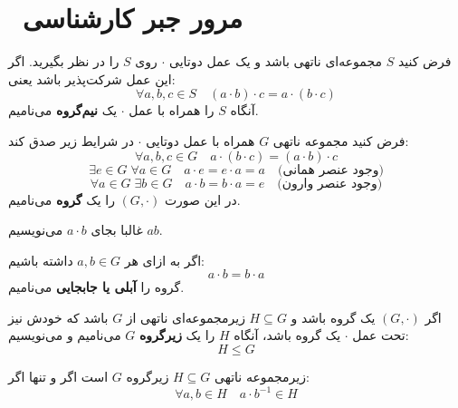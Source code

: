 \section{ مرور جبر کارشناسی}


\begin{definition}
    فرض کنید \( S \) مجموعه‌ای ناتهی باشد و یک عمل دوتایی \(\cdot\) روی \( S \) را در نظر بگیرید.  
    اگر این عمل شرکت‌پذیر باشد یعنی:
    \[
        \forall a, b, c \in S \quad (a \cdot b) \cdot c = a \cdot (b \cdot c)
    \]
    آنگاه \( S \) را همراه با عمل \(\cdot\) یک \textbf{نیم‌گروه } می‌نامیم.
    
\end{definition}



\begin{definition}[- گروه]
    فرض کنید مجموعه ناتهی \( G \) همراه با عمل دوتایی \(\cdot\) در شرایط زیر صدق کند:
    \[\forall a, b, c \in G \quad a \cdot (b \cdot c) = (a \cdot b) \cdot c\]
    \[\exists e \in G \; \forall a \in G \quad a \cdot e = e \cdot a = a \quad \text{(وجود عنصر همانی)}\]
    \[\forall a \in G \; \exists b \in G \quad a \cdot b = b \cdot a = e \quad \text{(وجود عنصر وارون)}\]
    در این صورت \( (G, \cdot) \) را یک \textbf{گروه} می‌نامیم.  
    
\end{definition}
\begin{remark}
    غالبا  بجای \( a \cdot b \) می‌نویسیم \( ab \).
    
\end{remark}
\begin{definition}
    اگر به ازای هر \( a, b \in G \) داشته باشیم:
    \[
        a \cdot b = b \cdot a
    \]
    گروه را \textbf{آبلی یا جابجایی} می‌نامیم.  
\end{definition}


\begin{definition}[ - زیرگروه]
    اگر \( (G, \cdot) \) یک گروه باشد و \( H \subseteq G \) زیرمجموعه‌ای ناتهی از \( G \) باشد که خودش نیز تحت عمل \(\cdot\) یک گروه باشد، آنگاه \( H \) را یک \textbf{زیرگروه} \( G \) می‌نامیم و می‌نویسیم:
    \[
        H \leq G
    \]
    
\end{definition}

\begin{theorem}
    
    زیرمجموعه ناتهی \( H \subseteq G \) زیرگروه \( G \) است اگر و تنها اگر:
    \[
        \forall a, b \in H \quad a \cdot b^{-1} \in H
    \]
\end{theorem}


